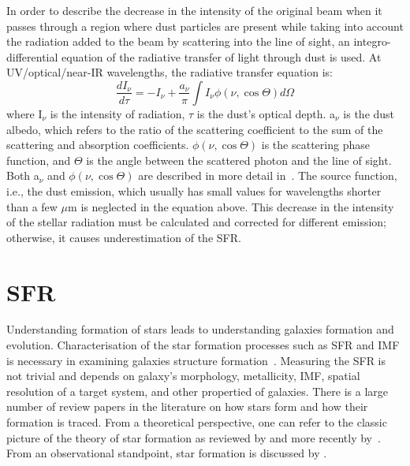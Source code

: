 In order to describe the decrease in the intensity of the original beam when it passes through a region where dust particles are present while taking into account the radiation added to the beam by scattering into the line of sight, an integro-differential equation of the radiative transfer of light through dust is used. 
At UV/optical/near-IR wavelengths, the radiative transfer equation is:
\begin{equation}
\frac{dI_{\nu}}{d\tau} = -I_{\nu}  + \frac{a_{\nu}}{\pi} \int I_{\nu}\phi(\nu,\cos \Theta)d\Omega
\end{equation}
where I$_{\nu}$ is the intensity of radiation, $\tau$ is the dust's optical depth.
a$_{\nu}$ is the dust albedo, which refers to the ratio of the scattering coefficient to the sum of the scattering and absorption coefficients. 
$\phi(\nu,\cos \Theta)$ is the scattering phase function, and $\Theta$ is the angle between the scattered photon and the line of sight. 
Both a$_{\nu}$ and $\phi(\nu,\cos \Theta)$ are described in more detail in~\citep{Draine03}. 
The source function, i.e., the dust emission, which usually has small values for wavelengths shorter than a few $\mu$m is neglected in the equation above. 
This decrease in the intensity of the stellar radiation must be calculated and corrected for different emission; otherwise, it causes underestimation of the SFR. 


\section{SFR}
\label{sec: sfr_intro}
Understanding formation of stars leads to understanding galaxies formation and evolution. 
Characterisation of the star formation processes such as SFR and IMF is necessary in examining galaxies structure formation~\citep{McKee07}. 
Measuring the SFR is not trivial and depends on galaxy's morphology, metallicity, IMF, spatial resolution of a target system, and other propertied of galaxies. 
There is a large number of review papers in the literature on how stars form and how their formation is traced. 
From a theoretical perspective, one can refer to the classic picture of the theory of star formation as reviewed by \cite{Shu87} and more recently by~\citep{McKee07}. 
From an observational standpoint, star formation is discussed by \cite[][and references therein]{Kennicutt98b, Kewley02, Calzetti13, Boquien10, Kennicutt12}.

